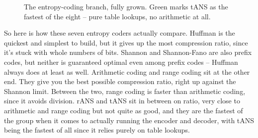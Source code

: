 \documentclass[11pt]{article}
\begin{document}
\begin{figure}[H]
\centering
{}
\caption{The entropy-coding branch, fully grown. Green
marks tANS as the fastest of the eight -- pure table lookups, no arithmetic at
all.}
\label{fig:entropy-full}
\end{figure}

So here is how these seven entropy coders actually compare. Huffman is the
quickest and simplest to build, but it gives up the most compression ratio,
since it's stuck with whole numbers of bits. Shannon and Shannon-Fano are
also prefix codes, but neither is guaranteed optimal even among prefix codes
-- Huffman always does at least as well. Arithmetic coding and range coding
sit at the other end. They give you the best possible compression ratio,
right up against the Shannon limit. Between the two, range coding is faster
than arithmetic coding, since it avoids division. rANS and tANS sit in
between on ratio, very close to arithmetic and range coding but not quite as
good, and they are the fastest of the group when it comes to actually running
the encoder and decoder, with tANS being the fastest of all since it relies
purely on table lookups.
\end{document}
